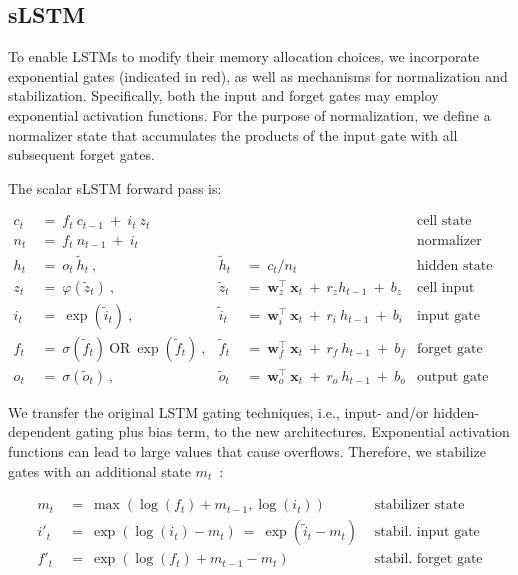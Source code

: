 \subsection{sLSTM}
\label{sec:sLSTM}

To enable LSTMs to modify their memory allocation choices, we incorporate exponential gates (indicated in red), as well as mechanisms for normalization and stabilization. Specifically, both the input and forget gates may employ exponential activation functions. For the purpose of normalization, we define a normalizer state that accumulates the products of the input gate with all subsequent forget gates.

The scalar sLSTM forward pass is:

\begin{align}
\label{eq:slstmforward}
c_t \ &= \  f_t \ c_{t-1} \ + \ i_t \ z_t & & 
 &\text{cell state} \\
n_t \ &= \  f_t \ n_{t-1} \ + \ i_t  & & 
 &\text{normalizer state} \\
h_t \ &= \ o_t \ \tilde{h}_t \ ,
  &\tilde{h}_t \ &= \ c_t / n_t
&\text{hidden state} \\
z_t \ &= \ \varphi \left( \tilde{z}_t \right) \ , 
  &\tilde{z}_t \ &=  \ \mathbf{w}^\top_{z} \ \mathbf{x}_t \ + \
  r_{z}  h_{t-1} \ + \  b_{z}
  &\text{cell input} \\
i_t \ &= \ \!\exp \left( \tilde{i}_t  \right) \ , 
  &\tilde{i}_t \ &= \ \mathbf{w}^\top_{i} \ \mathbf{x}_t \ + \
  r_{i}  \ h_{t-1} \ + \  b_{i}
  &\text{input gate} \\
f_t \ &= \ \sigma \left(  \tilde{f}_t \right) \ \text{OR} \
\!\exp \left(  \tilde{f}_t \right) \ ,
  &\tilde{f}_t \ &= \ \mathbf{w}^\top_{f} \ \mathbf{x}_t  \ + \
  r_{f}  \ h_{t-1} \ + \  b_{f}
  &\text{forget gate} \\
o_t \ &= \ \sigma \left( \tilde{o}_t \right) \ , 
  &\tilde{o}_t  \ &= \ \mathbf{w}^\top_{o} \ \mathbf{x}_t \ + \
  r_{o}  \ h_{t-1} \ + \  b_{o}
  &\text{output gate} 
\end{align}

We transfer the original LSTM gating techniques, i.e., input- and/or hidden-dependent gating plus bias term, to the new architectures. Exponential activation functions can lead to large values that cause overflows. Therefore, we stabilize gates with an additional state \mbox{$m_t$~\citep{Milakov:18arxiv}}:

\begin{align}
\label{eq:slstmstabil}
m_t \ &= \ \max \left( \log ( f_t ) + m_{t-1} , \log ( i_t ) \right) &\text{stabilizer state} \\
i'_t \ &= \ \!\exp \left( \log \left ( i_t \right) - m_t \right) \ = \ \!\exp \left( \tilde{i}_t - m_t \right) \ \, 
  &\text{stabil. input gate} \\
f'_t \ &= \ \!\exp \left( \log \left( f_t \right) + m_{t-1} - m_t \right) \ \, 
  &\text{stabil. forget gate}
\end{align}

